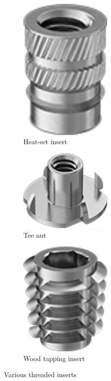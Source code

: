 \documentclass[10pt,letterpaper]{book}
\begin{document}
\begin{figure}[H]
		\begin{subfigure}[b]{.24\linewidth}
			\includegraphics[width=0.5\textwidth]{imgs/heatset.png}
			\caption{Heat-set insert}
		\end{subfigure}\begin{subfigure}[b]{.24\linewidth}
			\includegraphics[width=0.5\textwidth]{imgs/teenut.png}
			\caption{Tee nut}
		\end{subfigure}\begin{subfigure}[b]{.24\linewidth}
			\includegraphics[width=0.5\textwidth]{imgs/woodsti.png}
			\caption{Wood tapping insert}
		\end{subfigure}
		\caption{Various threaded inserts}
	\end{figure}
	
\end{document}
